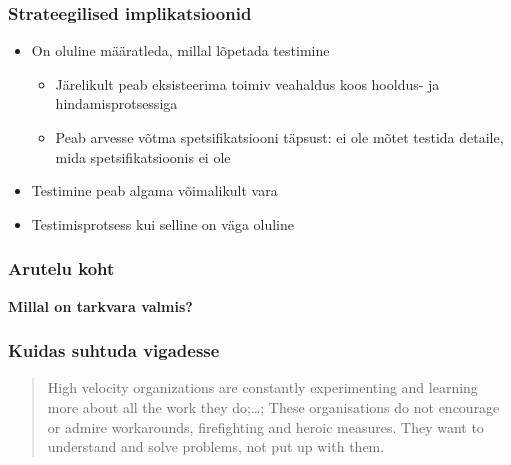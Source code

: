 \begin{frame}[fragile]
  \frametitle{Strateegilised implikatsioonid}
	\begin{itemize}
		\item On oluline määratleda, millal lõpetada testimine
		\begin{itemize}
			\item Järelikult peab eksisteerima toimiv veahaldus koos hooldus- ja hindamisprotsessiga
			\item Peab arvesse võtma spetsifikatsiooni täpsust: ei ole mõtet testida detaile, mida spetsifikatsioonis ei ole
		\end{itemize}
		\item Testimine peab algama võimalikult vara
		\item Testimisprotsess kui selline on väga oluline
	\end{itemize}
	
\end{frame}


\begin{frame}[fragile]
  \frametitle{Arutelu koht}
		\begin{center}
			\textbf{Millal on tarkvara valmis?}
		\end{center}
\end{frame}

\begin{frame}[fragile]
	\frametitle{Kuidas suhtuda vigadesse}
	\vfill
	\begin{center}
	\begin{quote}
		High velocity organizations are constantly experimenting and learning more about all the work they do;\dots; These organisations do not encourage or admire workarounds, firefighting and heroic measures. They want to understand and solve problems, not put up with them.
		\end{quote}
	\end{center}
	\cite{spear2010high}
\end{frame}

